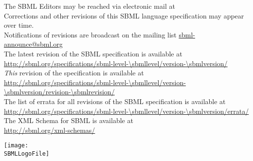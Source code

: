 \date{SBML \thisLV\\[5pt]Revision~\sbmlrevision\\[5pt]
  \sbmldate}



\maketitle

\vspace*{3ex}

\begin{center}
The SBML Editors may be reached via electronic mail at \\[10pt]

Corrections and other revisions of this SBML language specification may appear over time.\\
Notifications of revisions are broadcast on the mailing list \url{sbml-announce@sbml.org}\\[10pt]

The latest revision of the SBML \thisLV specification is available at\\
\url{http://sbml.org/specifications/sbml-level-\sbmllevel/version-\sbmlversion/}\\[10pt]

\emph{This} revision of the specification is available at\\
\url{http://sbml.org/specifications/sbml-level-\sbmllevel/version-\sbmlversion/revision-\sbmlrevision/}\\[10pt]

The list of errata for all revisions of the SBML \thisLV specification is available at\\
\url{http://sbml.org/specifications/sbml-level-\sbmllevel/version-\sbmlversion/errata/}\\[10pt]

The XML Schema for SBML \thisLV is available at\\
\url{http://sbml.org/xml-schemas/}\\[10pt]
\end{center}

\vfill


\ifgrayscalespec
  \newcommand{\logofilebasename}{sbml-logo-gray}
\else
  \newcommand{\logofilebasename}{sbml-logo}
\fi


\ifx\pdfoutput\undefined%
  \newcommand{\SBMLLogoFile}{\logofilebasename}
\else
  \newcommand{\SBMLLogoFile}{\logofilebasename.jpg}
\fi

\centerline{\texttt{[image: \\SBMLLogoFile]}}
